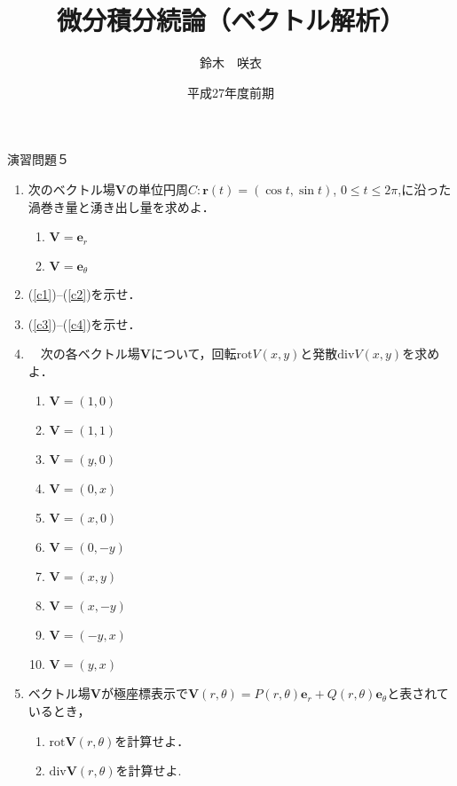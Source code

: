 \documentclass{jarticle}
\begin{document}
\title{微分積分続論（ベクトル解析）} 
\author{鈴木　咲衣}
\date{平成27年度前期}
\maketitle

\begin{center} {\Large 演習問題５ } \end{center}

\begin{enumerate}
\item 次のベクトル場$\bm V$の単位円周$C: \bm r(t)=(\cos t, \sin t)$, $0\leq t\leq 2\pi$,に沿った渦巻き量と湧き出し量を求めよ．
\begin{enumerate}
\item
$\bm V=\bm e_{r}$
\item
$\bm V=\bm e_{\theta}$
\end{enumerate}
\item (\ref{c1})--(\ref{c2})を示せ．
\item (\ref{c3})--(\ref{c4})を示せ．
\item \cite[問題6.16]{koba}　次の各ベクトル場$\bm V$について，回転$\mathrm {rot} V(x,y)$と発散$\mathrm {div} V(x,y)$を求めよ．
\begin{enumerate}
\item $\bm V=(1,0)$
\item $\bm V=(1,1)$
\item $\bm V=(y,0)$
\item $\bm V=(0,x)$
\item $\bm V=(x,0)$
\item $\bm V=(0,-y)$
\item $\bm V=(x,y)$
\item $\bm V=(x,-y)$
\item $\bm V=(-y,x)$
\item $\bm V=(y,x)$
\end{enumerate}
\item \cite[問題6.24]{koba}ベクトル場$\bm V$が極座標表示で$\bm V(r, \theta)=P(r,\theta) \bm e_{r}+ Q (r, \theta) \bm e_{\theta}$と表されているとき，
\begin{enumerate}
\item $\mathrm {rot} \bm V (r,\theta)$を計算せよ．
\item $\mathrm {div} \bm V (r,\theta)$を計算せよ. 
\end{enumerate}
\end{enumerate}

\newpage
\end{document}
